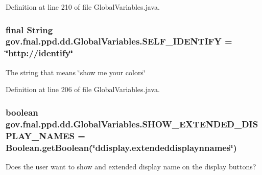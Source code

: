 Definition at line 210 of file Global\-Variables.\-java.

\hypertarget{classgov_1_1fnal_1_1ppd_1_1dd_1_1GlobalVariables_aaaf6fe49f89ce39ddba1fac773161acf}{
\subsubsection[{S\-E\-L\-F\-\_\-\-I\-D\-E\-N\-T\-I\-F\-Y}]{\setlength{\rightskip}{0pt plus 5cm}final String gov.\-fnal.\-ppd.\-dd.\-Global\-Variables.\-S\-E\-L\-F\-\_\-\-I\-D\-E\-N\-T\-I\-F\-Y = \char`\"{}http\-://identify\char`\"{}\hspace{0.3cm}{\ttfamily [static]}}}\label{classgov_1_1fnal_1_1ppd_1_1dd_1_1GlobalVariables_aaaf6fe49f89ce39ddba1fac773161acf}
The string that means \char`\"{}show me your colors\char`\"{} 

Definition at line 206 of file Global\-Variables.\-java.

\hypertarget{classgov_1_1fnal_1_1ppd_1_1dd_1_1GlobalVariables_a24c624ba470a455c7ed0c43d72a9f417}{
\subsubsection[{S\-H\-O\-W\-\_\-\-E\-X\-T\-E\-N\-D\-E\-D\-\_\-\-D\-I\-S\-P\-L\-A\-Y\-\_\-\-N\-A\-M\-E\-S}]{\setlength{\rightskip}{0pt plus 5cm}boolean gov.\-fnal.\-ppd.\-dd.\-Global\-Variables.\-S\-H\-O\-W\-\_\-\-E\-X\-T\-E\-N\-D\-E\-D\-\_\-\-D\-I\-S\-P\-L\-A\-Y\-\_\-\-N\-A\-M\-E\-S = Boolean.\-get\-Boolean(\char`\"{}ddisplay.\-extendeddisplaynnames\char`\"{})\hspace{0.3cm}{\ttfamily [static]}}}\label{classgov_1_1fnal_1_1ppd_1_1dd_1_1GlobalVariables_a24c624ba470a455c7ed0c43d72a9f417}
Does the user want to show and extended display name on the display buttons? 


